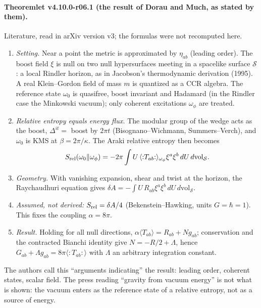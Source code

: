\paragraph{Theoremlet v4.10.0-r06.1 (the result of Dorau and Much, as stated by them).}
Literature, read in arXiv version v3; the formulas were not recomputed here.
\begin{enumerate}[leftmargin=2em]
\item[(a)] \emph{Setting.} Near a point the metric is approximated by \(\eta_{ab}\) (leading order).  The boost field \(\xi\) is null on two null
hypersurfaces meeting in a spacelike surface \(\mathcal S\): a local Rindler horizon, as in Jacobson's thermodynamic derivation (1995).  A real
Klein--Gordon field of mass \(m\) is quantized as a CCR algebra.  The reference state \(\omega_0\) is quasifree, boost invariant and Hadamard (in the
Rindler case the Minkowski vacuum); only coherent excitations \(\omega_\phi\) are treated.
\item[(b)] \emph{Relative entropy equals energy flux.} The modular group of the wedge acts as the boost, \(\Delta^{it}=\) boost by \(2\pi t\)
(Bisognano--Wichmann, Summers--Verch), and \(\omega_0\) is KMS at \(\beta=2\pi/\kappa\).  The Araki relative entropy then becomes
\[
S_{\rm rel}(\omega_0\Vert\omega_\phi)=-2\pi\int U\,\langle{:}T_{ab}{:}\rangle_{\omega_\phi}\xi^a\xi^b\,dU\,d\mathrm{vol}_{\mathcal S}.
\]
\item[(c)] \emph{Geometry.} With vanishing expansion, shear and twist at the horizon, the Raychaudhuri equation gives
\(\delta A=-\int U\,R_{ab}\xi^a\xi^b\,dU\,d\mathrm{vol}_{\mathcal S}\).
\item[(d)] \emph{Assumed, not derived:} \(S_{\rm rel}=\delta A/4\) (Bekenstein--Hawking, units \(G=\hbar=1\)).  This fixes the coupling \(\alpha=8\pi\).
\item[(e)] \emph{Result.} Holding for all null directions, \(\alpha\langle T_{ab}\rangle=R_{ab}+Ng_{ab}\); conservation and the contracted Bianchi identity
give \(N=-R/2+\Lambda\), hence \(G_{ab}+\Lambda g_{ab}=8\pi\langle{:}T_{ab}{:}\rangle\) with \(\Lambda\) an arbitrary integration constant.
\end{enumerate}
The authors call this ``arguments indicating'' the result: leading order, coherent states, scalar field.  The press reading ``gravity from vacuum
energy'' is not what is shown: the vacuum enters as the reference state of a relative entropy, not as a source of energy.

